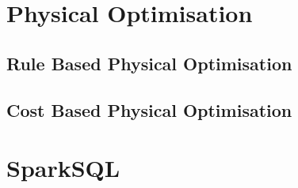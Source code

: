 \section{Physical Optimisation}

\subsection{Rule Based Physical Optimisation}


\subsection{Cost Based Physical Optimisation}


\section{SparkSQL}
\unfinished
